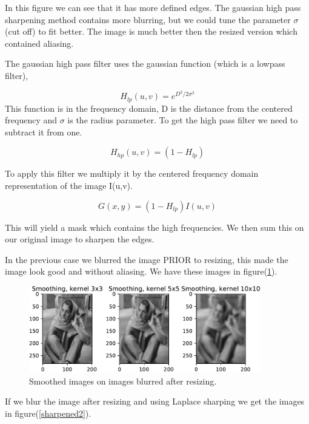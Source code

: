 {In this figure we can see that it has more defined edges. The gaussian high pass sharpening method contains more blurring, but we could tune the parameter $\sigma$(cut off) to fit better. The image is much better then the resized version which contained aliasing.

The gaussian high pass filter uses the gaussian function (which is a lowpass filter),

\begin{equation}
    H_{lp}(u,v) = e^{D^2/2\sigma^2}
    \label{gausslowp}
\end{equation}
This function is in the frequency domain, D is the distance from the centered frequency and $\sigma$ is the radius parameter. To get the high pass filter we need to subtract it from one.

\begin{equation}
    H_{hp}(u,v) = (1 - H_{lp})
    \label{gausshighp}
\end{equation}

To apply this filter we multiply it by the centered frequency domain representation of the image I(u,v).

\begin{equation}
    G(x,y) =  (1 - H_{lp})I(u,v)
\end{equation}

This will yield a mask which contains the high frequencies. We then sum this on our original image to sharpen the edges.

In the previous case we blurred the image PRIOR to resizing, this made the image look good and without aliasing. We have these images in figure(\ref{smooth2}).

\begin{figure}[!htb]
    {\centering
        \includegraphics[width=0.90\textwidth]{smoothafter.pdf}
        \caption{Smoothed images on images blurred after resizing.}
        \label{smooth2}
    \par}
    \end{figure}

If we blur the image after resizing and using Laplace sharping we get the images in figure(\ref{sharpened2}).

}

